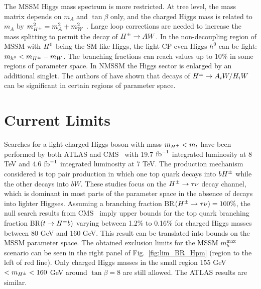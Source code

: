  
The MSSM Higgs mass spectrum is more restricted. At tree level, the mass matrix depends on $m_A$ and $\tan\beta$ only,  and  the charged Higgs mass is related to $m_A$ by $m_{H^{\pm}}^2 =m_A^2 + m_W^2$ . Large loop corrections are needed to increase the mass splitting to permit the decay of $H^{\pm} \to A W$.  In the non-decoupling region of MSSM with $H^0$ being the SM-like Higgs,  the light CP-even Higgs $h^0$ can be light: $m_{h^0}<m_{H^{\pm}}-m_W$. The branching fractions can reach values up to 10\% \cite{Heinemeyer:2013tqa} in some regions of parameter space.    In NMSSM the Higgs sector is enlarged by an additional singlet. The authors of \cite{Christensen:2013dra,Drees:1999sb} have shown that decays of $H^{\pm} \to A_iW/H_iW$ can be significant in certain regions of parameter space. 
 

 \section{Current Limits}
 \label{sec:limits}

Searches for a light charged Higgs boson with mass $m_{H^{\pm}}<m_t$ have been performed by both ATLAS and CMS~\cite{TheATLAScollaboration:2013wia,CMS:2014cdp} with 19.7 $ \text{fb}^{-1} $ integrated luminosity at 8 TeV and 4.6 $ \text{fb}^{-1} $ integrated luminosity at 7 TeV.  The production mechanism considered is top pair production in which one top quark decays into  $bH^{\pm} $ while the other   decays into $bW$. These studies focus on the $H^{\pm} \rightarrow \tau \nu$ decay channel, which is dominant in most parts of the parameter space in the absence of decays into lighter Higgses.   Assuming a branching fraction BR$(H^{\pm} \rightarrow \tau \nu) = 100 \%$,  the null search results from CMS~\cite{CMS:2014cdp} imply   upper bounds for the top quark branching fraction BR$(t \rightarrow H^{\pm} b)$ varying between   1.2\%  to 0.16\% for charged Higgs masses between 80 GeV and 160 GeV.  This result can be translated into bounds on the MSSM parameter space.  The obtained exclusion limits for the MSSM $m_h^\text{max}$ scenario can be seen in the right panel of Fig.~\ref{fig:lim_BR_Hpm} (region to the left of red line).   Only charged Higgs masses in the small region 155 GeV $<  m_{H^{\pm}} < 160 $ GeV around $\tan \beta = 8$ are still allowed.  The ATLAS results \cite{TheATLAScollaboration:2013wia} are similar.
 
